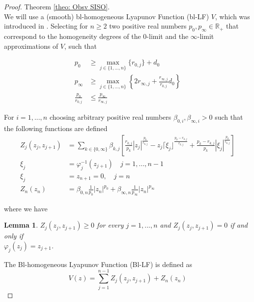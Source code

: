 \documentclass[11pt,letterpaper,twoside,openright]{report}
\newcommand{\RE}{\mathbb{R}}
\newtheorem{lemma}{Lemma}[chapter]
\begin{document}
\begin{proof}{Theorem \ref{theo: Obsv SISO}. \\}
	We will use a (smooth) bl-homogeneous Lyapunov Function (bl-LF) $V$, which was introduced in \cite{Moreno2021}. Selecting for $n \geq 2$ two positive real numbers $p_0,p_{\infty}\in \RE_+$ that correspond to the homogeneity degrees of the $0$-limit and the $\infty$-limit approximations of $V$, such that
	
	\begin{equation}
		\begin{split}\label{ecu: cond p0 pinf}
			p_0 &\geq \max\limits_{ j \in \{1,...,n\} } \lbrace r_{0,j}\rbrace + d_0  \\
			p_\infty &\geq \max\limits_{j \in \{1,...,n\}} \left\lbrace 2r_{\infty,j} + \frac{r_{\infty,j}}{r_{0,j}} d_0 \right\rbrace \\
			\frac{p_0}{r_{0,j}} &\leq \frac{p_\infty}{r_{\infty,j}}
		\end{split}
	\end{equation}

	For $i=1,...,n$ choosing arbitrary positive real numbers $\beta_{0,i},\beta_{\infty,i} > 0$ such that the following functions are defined
	\begin{equation}
		\begin{split}
			Z_j(z_j,z_{j+1}) &= \displaystyle\sum_{k\in \{0,\infty\}}^{}  \beta_{k,j} \left[ \frac{r_{k,j}}{p_k}|z_j|^{\frac{p_k}{r_{k,j}}} - z_j \lceil \xi_j \rfloor^{\frac{p_k-r_{k,j}}{r_{k,j}}} + \frac{p_k-r_{k,j}}{p_k}|\xi_j|^{\frac{p_k}{r_{k,j}}}   \right]\\
			\xi_j &= \varphi_j^{-1}(z_{j+1}) \quad j=1,...,n-1 \\
			\xi_j &= z_{n+1} =0, \quad j=n \\
			Z_n(z_n) &= \beta_{0,n} \frac{1}{p_0}|z_n|^{p_0} + \beta_{\infty,n} \frac{1}{p_\infty}|z_n|^{p_\infty} 
		\end{split}
	\end{equation}
	
	where we have
	\begin{lemma}
		\cite{Moreno2021} $Z_{j}(z_{j},z_{j+1}) \geq 0$ for every $j=1,...,n$ and $Z_{j}(z_{j},z_{j+1}) = 0$ if and only if \\ $\varphi_{j}(z_{j})=z_{j+1}$.
	\end{lemma}
	 
	The Bl-homogeneous Lyapunov Function (Bl-LF) is defined as
	\begin{equation}\label{ecu: V}
		V(z) = \displaystyle\sum_{j=1}^{n-1} Z_j(z_j,z_{j+1}) + Z_n(z_n)
	\end{equation}


\end{proof}
\end{document}
